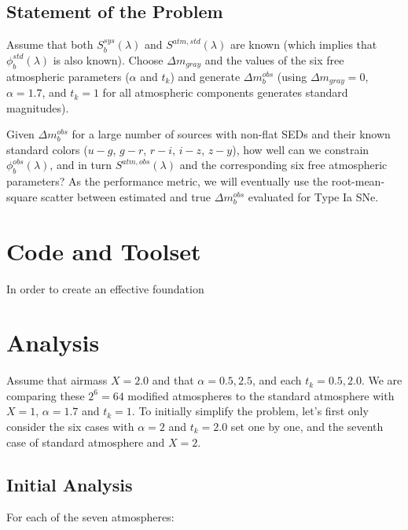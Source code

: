 \documentclass[12pt,preprint]{aastex}
\begin{document}
\subsection{Statement of the Problem} 

Assume that both $S^{sys}_b(\lambda)$ and $S^{atm,std}(\lambda)$ are known (which
implies that $\phi_b^{std}(\lambda)$ is also known). Choose $\Delta m_{gray}$ and the values of 
the six free atmospheric parameters ($\alpha$ and $t_k$) and generate $\Delta m_b^{obs}$
(using $\Delta m_{gray}=0$, $\alpha=1.7$, and $t_k=1$ for all atmospheric components 
generates standard magnitudes). 

Given $\Delta m_b^{obs}$ for a large number of sources with non-flat SEDs
and their known standard colors ($u-g$, $g-r$, $r-i$, $i-z$, $z-y$), how well can we
constrain $\phi_b^{obs}(\lambda)$, and in turn $S^{atm,obs}(\lambda)$ and the corresponding 
six free atmospheric parameters?  As the performance metric, we will eventually use the 
root-mean-square scatter between estimated and true $\Delta m_b^{obs}$ evaluated for Type Ia SNe. 

\section{Code and Toolset}

In order to create an effective foundation

\section{Analysis} 

Assume that airmass $X=2.0$ and that $\alpha=0.5, 2.5$, and each $t_k=0.5, 2.0$.
We are comparing these $2^6 = 64$ modified atmospheres to the standard atmosphere
with $X=1$, $\alpha=1.7$ and $t_k=1$. To initially simplify the problem, let's first only
consider the six cases with $\alpha=2$ and $t_k=2.0$ set one by one, and the 
seventh case of standard atmosphere and $X=2$. 


\subsection{Initial Analysis} 

For each of the seven atmospheres: 
\end{document}

